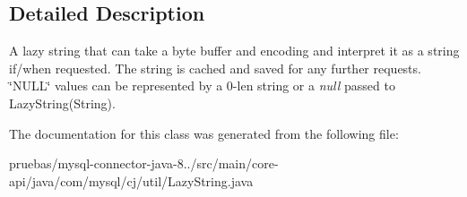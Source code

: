 \subsection{Detailed Description}
A lazy string that can take a byte buffer and encoding and interpret it as a string if/when requested. The string is cached and saved for any further requests. \char`\"{}\+N\+U\+L\+L\char`\"{} values can be represented by a 0-\/len string or a {\itshape null} passed to Lazy\+String(\+String). 

The documentation for this class was generated from the following file\+:\begin{DoxyCompactItemize}
\item 
pruebas/mysql-\/connector-\/java-\/8../src/main/core-\/api/java/com/mysql/cj/util/Lazy\+String.\+java\end{DoxyCompactItemize}
